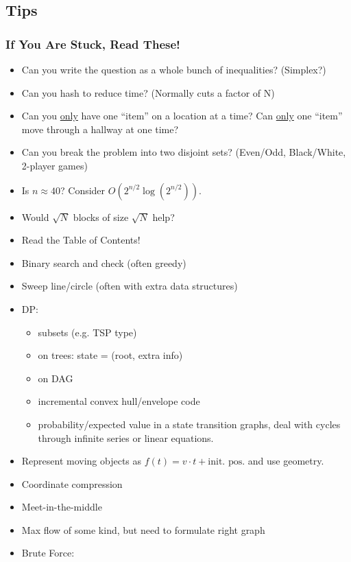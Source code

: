 \documentclass[landscape,10pt]{article}
\begin{document}
\begin{multicols*}{2}
\section{Tips}

\subsubsection*{If You Are Stuck, Read These!}

\begin{itemize}
 \item Can you write the question as a whole bunch of inequalities? (Simplex?)
 \item Can you hash to reduce time? (Normally cuts a factor of N)
 \item Can you \underline{only} have one ``item'' on a location at a time? Can \underline{only} one ``item'' move through a hallway at one time?
 \item Can you break the problem into two disjoint sets? (Even/Odd, Black/White, 2-player games)
 \item Is $n \approx 40$? Consider $O(2^{n/2}\log(2^{n/2}))$.
 \item Would $\sqrt{N}$ blocks of size $\sqrt{N}$ help?
 \item Read the Table of Contents!
 \item Binary search and check (often greedy)
 \item Sweep line/circle (often with extra data structures)
 \item DP:
   \begin{itemize}
   \item subsets (e.g. TSP type)
   \item on trees: state = (root, extra info)
   \item on DAG
   \item incremental convex hull/envelope code
   \item probability/expected value in a state transition graphs, deal
     with cycles through infinite series or linear equations.
   \end{itemize}
 \item Represent moving objects as $f(t) = v \cdot t +
   \text{init. pos}$. and use geometry.
 \item Coordinate compression
 \item Meet-in-the-middle
 \item Max flow of some kind, but need to formulate right graph
 \item Brute Force:

\end{itemize}
\end{multicols*}
\end{document}
